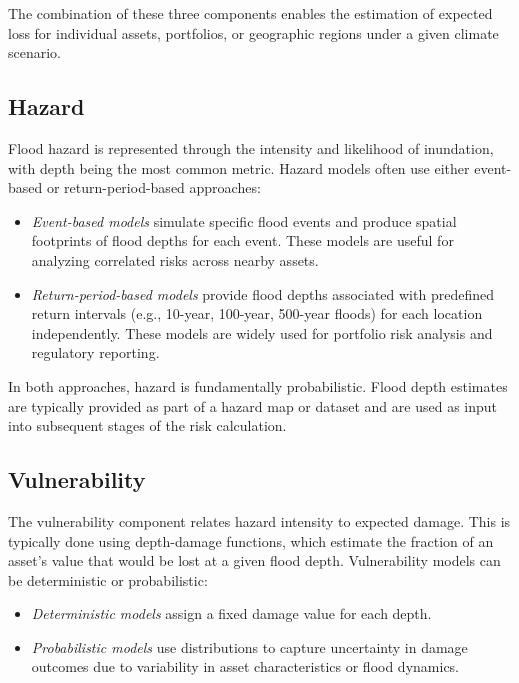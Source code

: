 \documentclass[a4paper,10.80pt,twoside]{article}
\begin{document}
The combination of these three components enables the estimation of expected loss for individual assets, portfolios, or geographic regions under a given climate scenario.

\subsection{Hazard}

Flood hazard is represented through the intensity and likelihood of inundation, with depth being the most common metric. Hazard models often use either event-based or return-period-based approaches:

\begin{itemize}
  \item \emph{Event-based models} simulate specific flood events and produce spatial footprints of flood depths for each event. These models are useful for analyzing correlated risks across nearby assets.
  \item \emph{Return-period-based models} provide flood depths associated with predefined return intervals (e.g., 10-year, 100-year, 500-year floods) for each location independently. These models are widely used for portfolio risk analysis and regulatory reporting.
\end{itemize}

In both approaches, hazard is fundamentally probabilistic. Flood depth estimates are typically provided as part of a hazard map or dataset and are used as input into subsequent stages of the risk calculation.

\subsection{Vulnerability}

The vulnerability component relates hazard intensity to expected damage. This is typically done using depth-damage functions, which estimate the fraction of an asset’s value that would be lost at a given flood depth. Vulnerability models can be deterministic or probabilistic:

\begin{itemize}
  \item \emph{Deterministic models} assign a fixed damage value for each depth.
  \item \emph{Probabilistic models} use distributions to capture uncertainty in damage outcomes due to variability in asset characteristics or flood dynamics.
\end{itemize}
\end{document}
